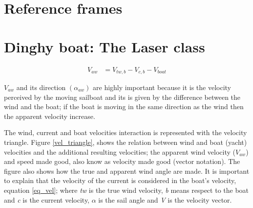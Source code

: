 \section{Reference frames}
\section{Dinghy boat: The Laser class}

\begin{equation}
\label{eq_vel}
\begin{aligned}
V_{aw} & = V_{tw,b} - V_{c,b} - V_{boat}
\end{aligned}
\end {equation}



$V_{aw}$ and its direction $( \alpha_{aw})$ are highly important because it is the velocity perceived by the moving sailboat and its is given by the difference between the wind and the boat; if the boat is moving in the same direction as the wind then the apparent velocity increase. \par 

The wind, current and boat velocities interaction is represented with the velocity triangle.  Figure \ref{vel_triangle}, shows the relation between wind and boat (yacht) velocities and the additional resulting velocities; the apparent wind velocity ($V_{aw}$) and speed made good,  also know as velocity made good (vector notation). The figure also shows how the true and apparent wind angle are made. It is important to explain that the velocity of the current is considered in the boat's velocity, equation \ref{eq_vel}; where \textit{tw} is the true wind velocity, \textit{b} means respect to the boat and \textit{c} is the current velocity, $\alpha$ is the sail angle and \textit{V} is the velocity vector. \par